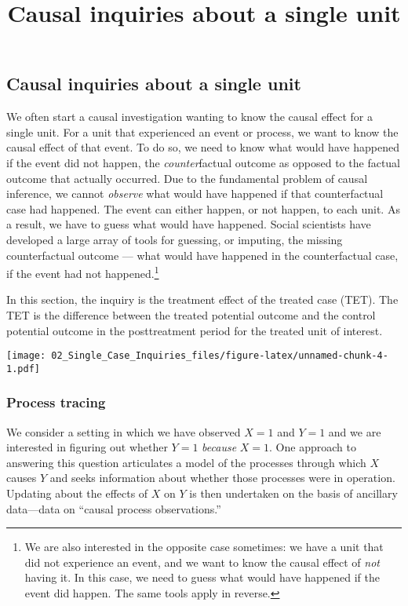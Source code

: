 \documentclass[
]{article}
\title{Causal inquiries about a single unit}
\author{}
\date{\vspace{-2.5em}}
\begin{document}
\maketitle

\hypertarget{causal-inquiries-about-a-single-unit}{%
\subsection{Causal inquiries about a single
unit}\label{causal-inquiries-about-a-single-unit}}

We often start a causal investigation wanting to know the causal effect
for a single unit. For a unit that experienced an event or process, we
want to know the causal effect of that event. To do so, we need to know
what would have happened if the event did not happen, the
\emph{counter}factual outcome as opposed to the factual outcome that
actually occurred. Due to the fundamental problem of causal inference,
we cannot \emph{observe} what would have happened if that counterfactual
case had happened. The event can either happen, or not happen, to each
unit. As a result, we have to guess what would have happened. Social
scientists have developed a large array of tools for guessing, or
imputing, the missing counterfactual outcome --- what would have
happened in the counterfactual case, if the event had not
happened.\footnote{We are also interested in the opposite case
  sometimes: we have a unit that did not experience an event, and we
  want to know the causal effect of \emph{not} having it. In this case,
  we need to guess what would have happened if the event did happen. The
  same tools apply in reverse.}

In this section, the inquiry is the treatment effect of the treated case
(TET). The TET is the difference between the treated potential outcome
and the control potential outcome in the posttreatment period for the
treated unit of interest.

\texttt{[image: 02\_Single\_Case\_Inquiries\_files/figure-latex/unnamed-chunk-4-1.pdf]}

\hypertarget{process-tracing}{%
\subsubsection{Process tracing}\label{process-tracing}}

We consider a setting in which we have observed \(X=1\) and \(Y=1\) and
we are interested in figuring out whether \(Y=1\) \emph{because}
\(X=1\). One approach to answering this question articulates a model of
the processes through which \(X\) causes \(Y\) and seeks information
about whether those processes were in operation. Updating about the
effects of \(X\) on \(Y\) is then undertaken on the basis of ancillary
data---data on ``causal process observations.''
\end{document}
